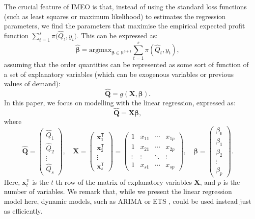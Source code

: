\documentclass[a4paper,11pt]{article}
\begin{document}
The crucial feature of IMEO is that, instead of using the standard loss functions (such as least squares or maximum likelihood) to estimates the regression parameters, we find the parameters that maximise the empirical expected profit function $\sum_{t=1}^s{\pi \big( \hat{Q}_t,y_t \big)}$. This can be expressed as:
\[
    \hat{\boldsymbol{\beta}}=\text{argmax}_{\boldsymbol{\beta}\in \mathbb{R}^{p+1}}\displaystyle\sum_{t=1}^s{\pi(\hat{Q}_t,y_t)},
\]
assuming that the order quantities can be represented as some sort of function of a set of explanatory variables (which can be exogenous variables or previous values of demand):
\[
    \mathbf{\hat{Q}}=g\left(\mathbf{X},\boldsymbol{\beta}\right).
\]
In this paper, we focus on modelling with the linear regression, expressed as:
\[
    \mathbf{\hat{Q}}=\mathbf{X}\boldsymbol{\beta},
\]
where
\[
    \mathbf{\hat{Q}}=
    \begin{pmatrix}
        \hat{Q}_1\\
        \hat{Q}_2\\
        \vdots\\
        \hat{Q}_s
    \end{pmatrix}, \quad
    \mathbf{X}=
    \begin{pmatrix}
        \mathbf{x}_1^{\mathsf{T}}\\
        \mathbf{x}_2^{\mathsf{T}}\\
        \vdots\\
        \mathbf{x}_s^{\mathsf{T}}
    \end{pmatrix}=
    \begin{pmatrix}
        1&x_{11}&\cdots &x_{1p}\\
        1&x_{21}&\cdots &x_{2p}\\
        \vdots &\vdots &\ddots &\vdots \\
        1&x_{s1}&\cdots &x_{sp}
    \end{pmatrix}, \quad
    \boldsymbol{\beta}=
    \begin{pmatrix}
        \beta_0\\
        \beta_1\\
        \beta_2\\
        \vdots\\
        \beta_{p}
    \end{pmatrix}.
\]
Here, $\mathbf{x}_t^{\mathsf{T}}$ is the $t$-th row of the matrix of explanatory variables $\mathbf{X}$, and $p$ is the number of variables. We remark that, while we present the linear regression model here, dynamic models, such as ARIMA \cite{Box76} or ETS \cite{Hy08}, could be used instead just as efficiently.
\end{document}
